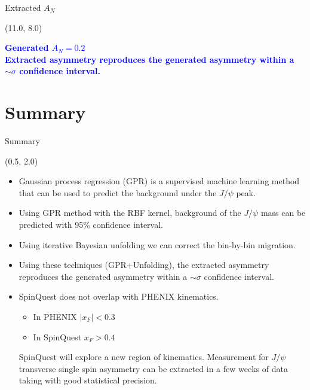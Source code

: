 \documentclass[10pt, xcolor={dvipsnames}, aspectratio = 169]{beamer}
\newcommand{\jpsi}{$J/\psi$ }
\begin{document}
\begin{frame}{Extracted $A_{N}$}
\begin{textblock}{5.0}(11.0, 8.0)
\begin{small}
\textcolor{blue}{\textbf{Generated $A_{N} = \text{0.2}$ \\
Extracted asymmetry reproduces the generated asymmetry within a $\sim \sigma$ confidence interval.}}
\end{small}
\end{textblock}

\end{frame}

%
%
\section{Summary}

\begin{frame}{Summary}

\begin{textblock}{15.0}(0.5, 2.0)

\begin{itemize}

\item Gaussian process regression (GPR) is a supervised machine learning method that can be used to predict the background under the \jpsi peak.

\item Using GPR method with the RBF kernel, background of the \jpsi mass can be predicted with 95\% confidence interval.

\item Using iterative Bayesian unfolding we can correct the bin-by-bin migration.

\item Using these techniques (GPR+Unfolding), the extracted asymmetry reproduces the generated asymmetry within a $\sim \sigma$
confidence interval.

\item  SpinQuest does not overlap with PHENIX kinematics.

\begin{itemize}

    \item In PHENIX $|x_{F}| < 0.3$

    \item In SpinQuest $x_{F} > 0.4$

\end{itemize}

SpinQuest  will explore a new region of kinematics. Measurement for \jpsi transverse single spin asymmetry can be extracted in a few weeks of data taking with good statistical precision.


\end{itemize}
\end{textblock}
\end{frame}
\end{document}
